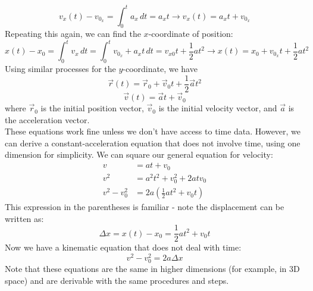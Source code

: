 \[
	v_x(t) - v_{0_{x}} = \int_0^t a_x \, dt = a_xt \rightarrow v_x(t) = a_xt + v_{0_{x}}
\]
Repeating this again, we can find the $x$-coordinate of position:
\[
	x(t) - x_0 = \int_0^t v_x \, dt = \int_0^t v_{0_{x}} + a_xt \, dt = v_{x0}t + \frac{1}{2}at^2  \rightarrow x(t) = x_0 + v_{0_{x}}t + \frac{1}{2}at^2
\]
Using similar processes for the $y$-coordinate, we have
\[
	\vec{r}(t) = \vec r_0 + \vec v_0 t + \frac{1}{2} \vec{a} t^2 
\]
\[
	\vec v(t) = \vec a t + \vec v_0
\]
where $\vec r_0$ is the initial position vector, $\vec v_0$ is the initial velocity vector, and $\vec a$ is the acceleration vector. \\
These equations work fine unless we don't have access to time data. However, we can derive a constant-acceleration equation that does not involve time, using one dimension for simplicity. We can square our general equation for velocity: 
\begin{align*}
	v &= at + v_0 \\
	v^2 &= a^2t^2 + v_0^2 + 2atv_0 \\
	v^2 - v_0^2 &= 2a\left(\frac{1}{2}at^2 + v_0t \right)
\end{align*}
This expression in the parentheses is familiar - note the displacement can be written as:
\[
	\Delta x = x(t) - x_0 = \frac{1}{2}at^2 + v_0t
\]
Now we have a kinematic equation that does not deal with time: 
\[
	v^2 - v_0^2 = 2a\Delta x
\]
Note that these equations are the same in higher dimensions (for example, in 3D space) and are derivable with the same procedures and steps. 

